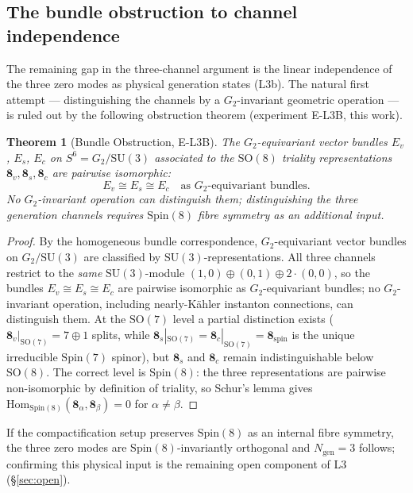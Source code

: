 \documentclass[12pt,a4paper]{article}
\newtheorem{theorem}[lemma]{Theorem}
\begin{document}
\subsection{The bundle obstruction to channel independence}
\label{sec:bundle-obstruction}

The remaining gap in the three-channel argument is the linear independence of the three
zero modes as physical generation states (L3b). The natural first attempt --- distinguishing
the channels by a $G_2$-invariant geometric operation --- is ruled out by the following
obstruction theorem (experiment E-L3B, this work).

\begin{theorem}[Bundle Obstruction, E-L3B]\label{thm:elb3}
  The $G_2$-equivariant vector bundles $E_v$, $E_s$, $E_c$ on $S^6 = G_2/\mathrm{SU}(3)$
  associated to the $\mathrm{SO}(8)$ triality representations $\mathbf{8}_v, \mathbf{8}_s,
  \mathbf{8}_c$ are pairwise isomorphic:
  \[
    E_v \cong E_s \cong E_c \quad\text{as }G_2\text{-equivariant bundles.}
  \]
  No $G_2$-invariant operation can distinguish them;
  distinguishing the three generation channels requires $\mathrm{Spin}(8)$ fibre symmetry
  as an additional input.
\end{theorem}

\begin{proof}
  By the homogeneous bundle correspondence, $G_2$-equivariant vector bundles on
  $G_2/\mathrm{SU}(3)$ are classified by $\mathrm{SU}(3)$-representations. All three
  channels restrict to the \emph{same} $\mathrm{SU}(3)$-module
  $(1,0)\oplus(0,1)\oplus 2\cdot(0,0)$, so the bundles $E_v\cong E_s\cong E_c$ are pairwise
  isomorphic as $G_2$-equivariant bundles; no $G_2$-invariant operation, including
  nearly-K\"ahler instanton connections, can distinguish them.
  At the $\mathrm{SO}(7)$ level a partial distinction exists
  ($\mathbf{8}_v|_{\mathrm{SO}(7)}=7\oplus 1$ splits, while $\mathbf{8}_s|_{\mathrm{SO}(7)}
  =\mathbf{8}_c|_{\mathrm{SO}(7)}=\mathbf{8}_{\mathrm{spin}}$ is the unique irreducible
  $\mathrm{Spin}(7)$ spinor), but $\mathbf{8}_s$ and $\mathbf{8}_c$ remain indistinguishable
  below $\mathrm{SO}(8)$.
  The correct level is $\mathrm{Spin}(8)$: the three representations are pairwise
  non-isomorphic by definition of triality, so Schur's lemma gives
  $\mathrm{Hom}_{\mathrm{Spin}(8)}(\mathbf{8}_\alpha,\mathbf{8}_\beta)=0$ for $\alpha\ne\beta$.
\end{proof}

If the compactification setup preserves $\mathrm{Spin}(8)$ as an internal fibre symmetry,
the three zero modes are $\mathrm{Spin}(8)$-invariantly orthogonal and $N_{\mathrm{gen}}=3$
follows; confirming this physical input is the remaining open component of L3
(\S\ref{sec:open}).
\end{document}
